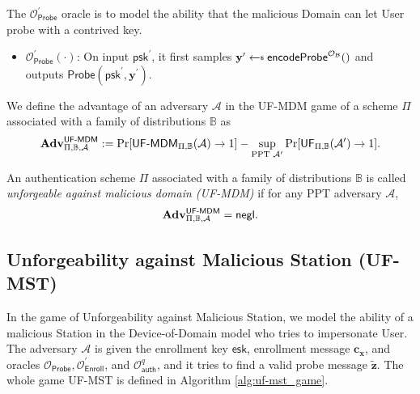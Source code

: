 The $\mathcal{O}_\textsf{Probe}^\prime$ oracle is to model the ability that the malicious \textsf{Domain} can let \textsf{User} probe with a contrived key.

\begin{itemize}

	\item $\mathcal{O}_\textsf{Probe}^\prime (\cdot)$: On input $\textsf{psk}^\prime$, it first samples $\mathbf{y}^\prime \getsdollar \textsf{encodeProbe}^{\mathcal{O}_{\mathcal{B}}}()$ and outputs $\textsf{Probe}(\textsf{psk}^\prime, \mathbf{y}^\prime)$.

\end{itemize}

We define the advantage of an adversary $\mathcal{A}$ in the \textsf{UF-MDM} game of a scheme $\Pi$ associated with a family of distributions $\mathbb{B}$ as
\[
	\mathbf{Adv}^{\textsf{UF-MDM}}_{\Pi, \mathbb{B}, \mathcal{A}} := \Pr[{\textsf{UF-MDM}}_{\Pi, \mathbb{B}}(\mathcal{A}) \to 1] -
	\sup_{\text{PPT } \mathcal{A}^\prime} \Pr[\textsf{UF}_{\Pi, \mathbb{B}}(\mathcal{A}^\prime) \to 1].
\]

An authentication scheme $\Pi$ associated with a family of distributions $\mathbb{B}$ is called \emph{unforgeable against malicious domain (UF-MDM)} if for any PPT adversary $\mathcal{A}$,
\[
	\mathbf{Adv}^{\textsf{UF-MDM}}_{\Pi, \mathbb{B}, \mathcal{A}} = \mathsf{negl}.
\]



\subsection{Unforgeability against Malicious Station (UF-MST)}
\label{sec:uf-mst_game}

In the game of Unforgeability against Malicious Station, we model the ability of a malicious \textsf{Station} in the Device-of-Domain model who tries to impersonate \textsf{User}.
The adversary $\mathcal{A}$ is given the enrollment key $\textsf{esk}$, enrollment message $\mathbf{c_x}$, and oracles $\mathcal{O}_\textsf{Probe}, \mathcal{O}_\textsf{Enroll}^\prime$, and $ \mathcal{O}_\textsf{auth}^q$, and it tries to find a valid probe message $\mathbf{\tilde{z}}$.
The whole game \textsf{UF-MST} is defined in Algorithm \ref{alg:uf-mst_game}. 

